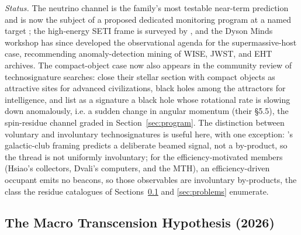 \documentclass[11pt]{article}
\begin{document}
\emph{Status.} The \citet{Dvali2023} neutrino channel is the family's most testable near-term prediction and is now the subject of a proposed dedicated monitoring program at a named target \citep{Swanson2026Campaign}; the high-energy SETI frame is surveyed by \citet{Lacki2025}, and the Dyson Minds workshop \citep{Curtis2026DysonMinds} has since developed the observational agenda for the supermassive-host case, recommending anomaly-detection mining of WISE, JWST, and EHT archives. The compact-object case now also appears in the community review of technosignature searches: \citet{Vidal2026Review} close their stellar section with compact objects as attractive sites for advanced civilizations, black holes among the attractors for intelligence, and list as a signature a black hole whose rotational rate is slowing down anomalously, i.e. a sudden change in angular momentum (their \S5.5), the spin-residue channel graded in Section~\ref{sec:program}. The distinction between voluntary and involuntary technosignatures \citep{Haliki2025} is useful here, with one exception: \citet{Inoue2011}'s galactic-club framing predicts a deliberate beamed signal, not a by-product, so the thread is not uniformly involuntary; for the efficiency-motivated members (Hsiao's collectors, Dvali's computers, and the MTH), an efficiency-driven occupant emits no beacons, so those observables are involuntary by-products, the class the residue catalogues of Sections~\ref{sec:mth} and \ref{sec:problems} enumerate.

\subsection{The Macro Transcension Hypothesis (2026)}
\label{sec:mth}
\end{document}
